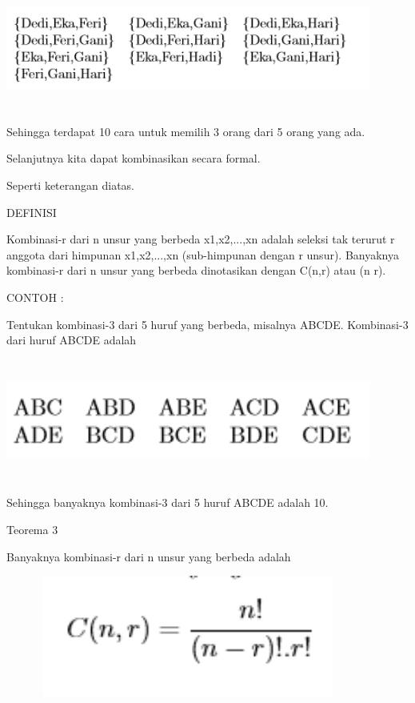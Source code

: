 \documentclass[11pt,fleqn]{book} %
\begin{document}
\includegraphics[width = 12cm, height= 4cm]{Pictures/herlin4.png}

Sehingga terdapat 10 cara untuk memilih 3 orang dari 5 orang yang ada.

Selanjutnya kita dapat kombinasikan secara formal.

Seperti keterangan diatas.



DEFINISI


Kombinasi-r dari n unsur yang berbeda x1,x2,...,xn adalah seleksi tak terurut r anggota dari himpunan {x1,x2,...,xn} (sub-himpunan dengan r unsur). Banyaknya kombinasi-r dari n unsur yang berbeda dinotasikan dengan C(n,r) atau (n r).

CONTOH :

Tentukan kombinasi-3 dari 5 huruf yang berbeda, misalnya ABCDE.
Kombinasi-3 dari huruf ABCDE adalah

\includegraphics[width = 12cm, height= 4cm]{Pictures/herlin5.png}

Sehingga banyaknya kombinasi-3 dari 5 huruf ABCDE adalah 10.

Teorema 3

Banyaknya kombinasi-r dari n unsur yang berbeda adalah

\includegraphics[width = 12cm, height= 4cm]{Pictures/herlin6.png}
\end{document}
